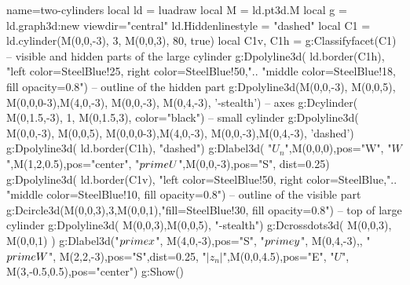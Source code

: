 \documentclass[border=5pt]{standalone}%
\begin{document}
\begin{luadraw}{name=two-cylinders}
local ld = luadraw
local M = ld.pt3d.M
local g = ld.graph3d:new{ viewdir="central" }
ld.Hiddenlinestyle = "dashed"
local C1 = ld.cylinder(M(0,0,-3), 3, M(0,0,3), 80, true)
local C1v, C1h = g:Classifyfacet(C1) -- visible and hidden parts of the large cylinder
g:Dpolyline3d( ld.border(C1h), "left color=SteelBlue!25, right color=SteelBlue!50,"..
    "middle color=SteelBlue!18, fill opacity=0.8") -- outline of the  hidden part
g:Dpolyline3d({{M(0,0,-3), M(0,0,5)}, {M(0,0,0-3),M(4,0,-3)},
    {M(0,0,-3), M(0,4,-3)}}, '-stealth') -- axes
g:Dcylinder( M(0,1.5,-3), 1, M(0,1.5,3), {color="black"}) -- small cylinder
g:Dpolyline3d( {{M(0,0,-3), M(0,0,5)}, {M(0,0,0-3),M(4,0,-3)}, {M(0,0,-3),M(0,4,-3)}}, 'dashed')
g:Dpolyline3d( ld.border(C1h), "dashed")
g:Dlabel3d( "$U_n$",M(0,0,0),{pos="W"}, "$W$",M(1,2,0.5),{pos="center"}, 
    "$\\prime U$",M(0,0,-3),{pos="S", dist=0.25})
g:Dpolyline3d( ld.border(C1v), "left color=SteelBlue!50, right color=SteelBlue,".. 
    "middle color=SteelBlue!10, fill opacity=0.8") -- outline of the visible part
g:Dcircle3d(M(0,0,3),3,M(0,0,1),"fill=SteelBlue!30, fill opacity=0.8") -- top of large cylinder
g:Dpolyline3d( {M(0,0,3),M(0,0,5)}, "-stealth")
g:Dcrossdots3d( {M(0,0,3), M(0,0,1)} )
g:Dlabel3d("$\\prime x$", M(4,0,-3),{pos="S"}, "$\\prime y$", M(0,4,-3),{},
    "$\\prime W$", M(2,2,-3),{pos="S",dist=0.25}, "$|z_n|$",M(0,0,4.5),{pos="E"},
    "$U$", M(3,-0.5,0.5),{pos="center"})
g:Show()
\end{luadraw}
\end{document}

